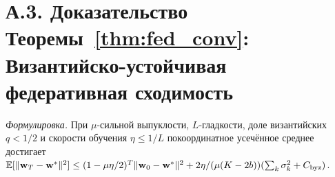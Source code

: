 \section*{А.3. Доказательство Теоремы~\ref{thm:fed_conv}: Византийско-устойчивая федеративная сходимость}
\label{app:proof_fed}

\noindent\textit{Формулировка.} При $\mu$-сильной выпуклости, $L$-гладкости, доле византийских $q<1/2$ и скорости обучения $\eta\le 1/L$ покоординатное усечённое среднее достигает $\mathbb{E}[\|\mathbf{w}_T-\mathbf{w}^*\|^2]\le(1-\mu\eta/2)^T\|\mathbf{w}_0-\mathbf{w}^*\|^2 + 2\eta/(\mu(K-2b))(\sum_k\sigma_k^2 + C_{\mathrm{byz}})$.

